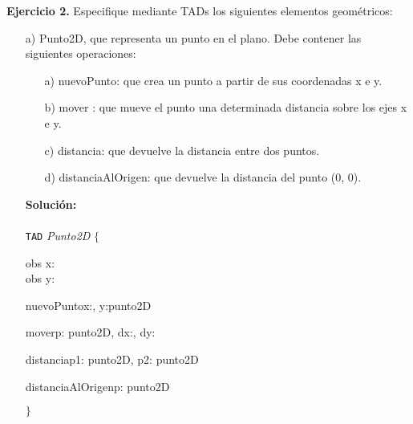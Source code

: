 \documentclass{article}
\newenvironment{tad}[1]{
	\paragraph{} \vspace*{-4mm}
	\newcommand{\obs}[2]{\texttt{obs} ##1 : ##2}

	\vspace{1ex}
	\texttt{TAD} \textit{#1} $\{$
	\par
	\tocarEspacios
}
{

\hspace{2.5mm} $\}$
\vspace{2ex}
}
\begin{document}
\textbf{Ejercicio 2.} Especifique mediante TADs los siguientes elementos geom\'etricos:
\begin{itemize}
    \item[a)] Punto2D, que representa un punto en el plano. Debe contener las siguientes operaciones:
    \begin{itemize}
        \item [a)] nuevoPunto: que crea un punto a partir de sus coordenadas x e y.
        \item [b)] mover : que mueve el punto una determinada distancia sobre los ejes x e y.
        \item [c)] distancia: que devuelve la distancia entre dos puntos.
        \item [d)] distanciaAlOrigen: que devuelve la distancia del punto (0, 0).
    \end{itemize}
    \textbf{Soluci\'on:}
    \begin{tad}{Punto2D}
        obs x: \float \\
        obs y: \float

        \begin{proc}{nuevoPunto}{\In x:\float, \In y:\float}{punto2D}
        \end{proc}

        \begin{proc}{mover}{\Inout p: punto2D, \In dx:\float, \In dy:\float}{}
        \end{proc}


        \begin{proc}{distancia}{\In p1: punto2D, \In p2: punto2D}{\float}
        \end{proc}

        \begin{proc}{distanciaAlOrigen}{\In p: punto2D}{\float}
        \end{proc}
    \end{tad}


\end{itemize}
\end{document}
